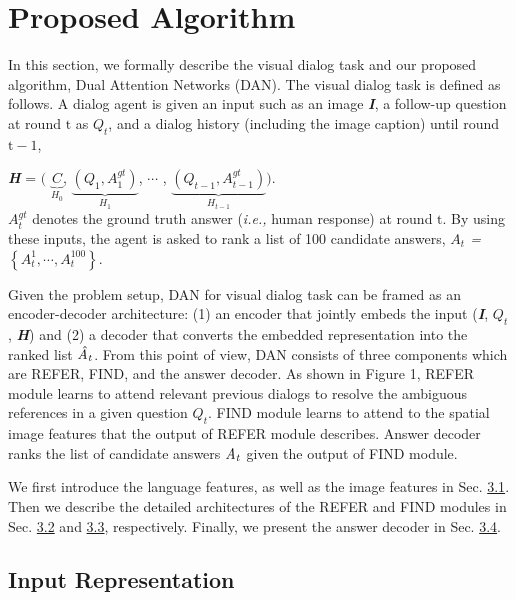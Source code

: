 \documentclass[11pt,a4paper]{article}
\begin{document}
\section{Proposed Algorithm}

In this section, we formally describe the visual dialog task and our proposed algorithm, Dual Attention Networks (DAN). The visual dialog task \cite{das2017visual} is defined as follows. A dialog agent is given an input such as an image {\bf{\it I}}, a follow-up question at round $\mathrm{t}$ as {\bf{\it $Q_t$}}, and a dialog history (including the image caption) until round $\mathrm{t-1}$,

{\bf{\it H}} = $($ $\underbrace{C}_{H_0}$, $\underbrace{(Q_1, A_1^{gt})}_{H_1}$, $\cdots$ , $\underbrace{(Q_{t-1}, A_{t-1}^{gt})}_{H_{t-1}}$$)$. \\ $A_t^{gt}$ denotes the ground truth answer ({\it i.e.,} human response) at round $\mathrm{t}$. By using these inputs, the agent is asked to rank a list of 100 candidate answers, {\it $A_t$ = $\left\{A_{t}^1, \cdots, A_{t}^{100} \right\}$}.

Given the problem setup, DAN for visual dialog task can be framed as an encoder-decoder architecture: (1) an encoder that jointly embeds the input ({\bf{\it I}}, {\bf{\it $Q_t$}}, {\bf{\it H}}) and (2) a decoder that converts the embedded representation into the ranked list $\hat{{\it A_t}}$. From this point of view, DAN consists of three components which are REFER, FIND, and the answer decoder. As shown in Figure 1, REFER module learns to attend relevant previous dialogs to resolve the ambiguous references in a given question {\bf{\it $Q_t$}}. FIND module learns to attend to the spatial image features that the output of REFER module describes. Answer decoder ranks the list of candidate answers ${\it A_t}$ given the output of FIND module.   

We first introduce the language features, as well as the image features in Sec. \hyperref[sec:inputrep]{3.1}. Then we describe the detailed architectures of the REFER and FIND modules in Sec. \hyperref[sec:refer]{3.2} and \hyperref[sec:find]{3.3}, respectively. Finally, we present the answer decoder in Sec. \hyperref[sec:ansdec]{3.4}.

\subsection{Input Representation}
\label{sec:inputrep}
\end{document}
